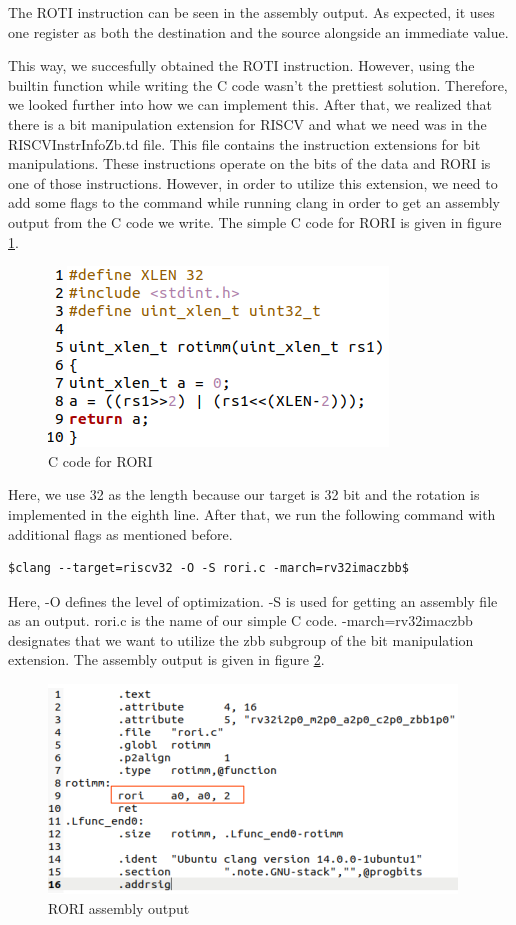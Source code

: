 The ROTI instruction can be seen in the assembly output. As expected, it uses one register as both  the destination and the source alongside an immediate value.

This way, we succesfully obtained the ROTI instruction. However, using the builtin function while writing the C code wasn’t the prettiest solution. Therefore, we looked further into how we can implement this. After that, we realized that there is a bit manipulation extension for RISCV and what we need was in the RISCVInstrInfoZb.td file. This file contains the instruction extensions for bit manipulations. These instructions operate on the bits of the data and RORI is one of those instructions. However, in order to utilize this extension, we need to add some flags to the command while running clang in order to get an assembly output from the C code we write. The simple C code for RORI is given in figure \ref{fig:c_code_for_rori}.
\begin{figure}
    \centering
    \includegraphics{adding_new_instr/c_code_for_rori.png}
    \caption{C code for RORI}
    \label{fig:c_code_for_rori}
\end{figure}

Here, we use 32 as the length because our target is 32 bit and the rotation is implemented in the eighth line. After that, we run the following command with additional flags as mentioned before.

\begin{lstlisting}
$clang --target=riscv32 -O -S rori.c -march=rv32imaczbb$
\end{lstlisting}

Here, -O defines the level of optimization. -S is used for getting an assembly file as an output. rori.c is the name of our simple C code. -march=rv32imaczbb designates that we want to utilize the zbb subgroup of the bit manipulation extension. The assembly output is given in figure \ref{fig:rori_assembly_output}.
\begin{figure}
    \centering
    \includegraphics{adding_new_instr/rori_assembly_output.png}
    \caption{RORI assembly output}
    \label{fig:rori_assembly_output}
\end{figure}

